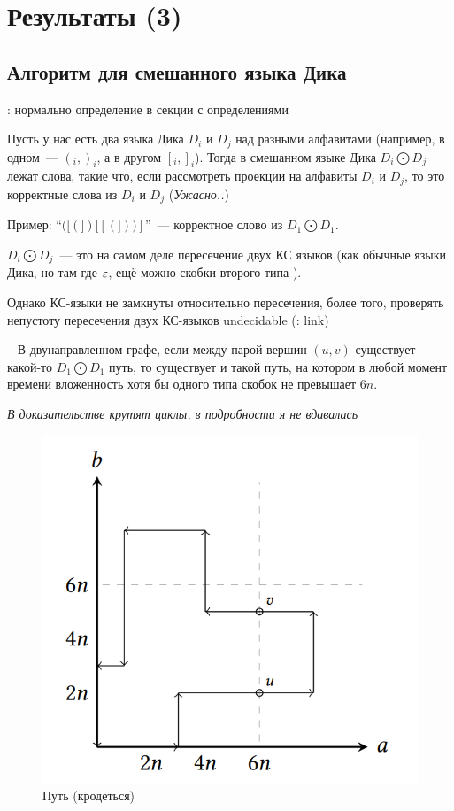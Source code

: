 \section{Результаты (3)}

\subsection{Алгоритм для смешанного языка Дика}

\begin{definition}
    \TODO: нормально определение в секции с определениями

    Пусть у нас есть два языка Дика $D_i$ и $D_j$ над разными алфавитами (например, в одном~--- $(_i, )_i$, а в другом $[_i, ]_i$). Тогда в смешанном языке Дика $D_i \bigodot D_j$ лежат слова, такие что, если рассмотреть проекции на алфавиты $D_i$ и $D_j$, то это корректные слова из $D_i$ и $D_j$ (\textit{Ужасно..})

    Пример: ``$([(])[[(]))]$''~--- корректное слово из $D_1 \bigodot D_1$. 
\end{definition}

\begin{note}
    $D_i \bigodot D_j$~--- это на самом деле пересечение двух КС языков (как обычные языки Дика, но там где $\varepsilon$, ещё можно скобки второго типа \TODO).

    Однако КС-языки не замкнуты относительно пересечения, более того, проверять непустоту пересечения двух КС-языков undecidable (\TODO: link)
\end{note}

\begin{lemma}~\cite{Li21}
    В двунаправленном графе, если между парой вершин $(u, v)$ существует какой-то $D_1 \bigodot D_1$ путь, то существует и такой путь, на котором в любой момент времени вложенность хотя бы одного типа скобок не превышает $6n$.

    \textit{В доказательстве крутят циклы, в подробности я не вдавалась}
\end{lemma}

\begin{figure}[H]
    \includegraphics[width=0.75\linewidth]{img/6n_6n_path}
    \caption{Путь (кродеться)}
\end{figure}

